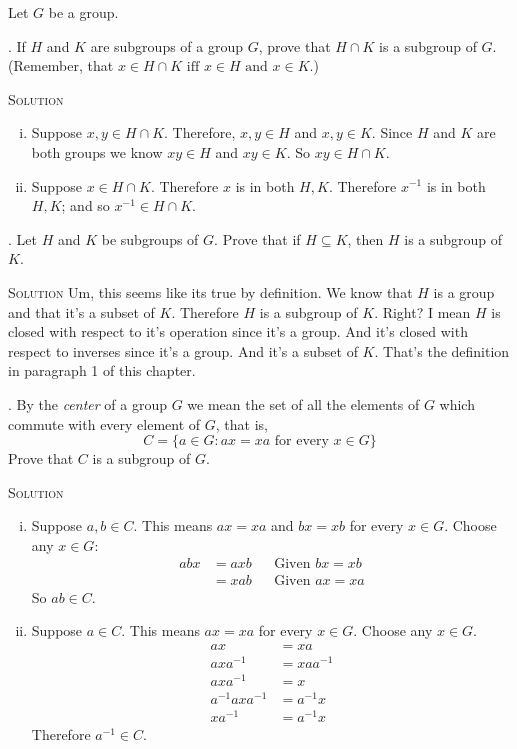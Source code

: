 \documentclass[twoside]{amsart}
\newcommand{\solution}{\textsc{Solution}\xspace}
\begin{document}
\begin{enumerate}[A.]
   \noindent Let $G$ be a group.

   . If $H$ and $K$ are subgroups of a group $G$, 
   prove that $H \cap K$ is a subgroup of $G$. (Remember, that
   $x\in H\cap K \text{ iff } x \in H \text{ and } x \in K$.)

   \noindent \solution 
   \begin{enumerate}[(i)]
      \item Suppose $x,y \in H \cap K$. Therefore, $x,y \in H$ and
      $x,y\in K$. Since $H$ and $K$ are both groups we know
      $xy \in H$ and $xy \in K$. So $xy \in H \cap K$.

      \item Suppose $x \in H \cap K$. Therefore $x$ is in both $H,K$. 
      Therefore $x^{-1}$ is in both $H,K$; and so $x^{-1} \in H \cap K$.
   \end{enumerate}

   . Let $H$ and $K$ be subgroups of $G$. Prove that
   if $H \subseteq K$, then $H$ is a subgroup of $K$.

   \noindent \solution Um, this seems like its true by definition.
   We know that $H$ is a group and that it's a subset of $K$.
   Therefore $H$ is a subgroup of $K$. Right? I mean $H$ is
   closed with respect to it's operation since it's a group. And
   it's closed with respect to inverses since it's a group. And
   it's a subset of $K$. That's the definition in paragraph 1 of
   this chapter.

   . By the \emph{center} of a group $G$ we mean the set of
   all the elements of $G$ which commute with every element of $G$,
   that is,
   \[
       C = \{ a\in G : ax = xa \text{ for every } x \in G\}
   \]
   Prove that $C$ is a subgroup of $G$.
   
   \noindent \solution 
   \begin{enumerate}[(i)]
      \item Suppose $a,b \in C$. This means $ax=xa$ and $bx=xb$ for every $x
      \in G$.  Choose any $x\in G$:
      \begin{align*}
         abx & = axb && \text{Given $bx=xb$} \\
	     & = xab && \text{Given $ax=xa$} 
      \end{align*}
      So $ab \in C$.

      \item Suppose $a \in C$. This means $ax=xa$ for every $x\in G$.
      Choose any $x\in G$.
      \begin{align*}
         ax & = xa \\
	 axa^{-1} & = xaa^{-1} \\
	 axa^{-1} & = x \\
	 a^{-1}axa^{-1} & = a^{-1}x \\
	 xa^{-1} & = a^{-1}x
      \end{align*}
      Therefore $a^{-1} \in C$.
   \end{enumerate}


\end{enumerate}
\end{document}
